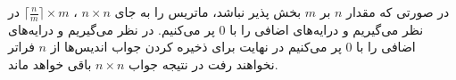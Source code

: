 \documentclass[conference]{IEEEtran-ModifiedForMVIP}
\begin{document}
در صورتی که مقدار $n$ بر $m$ بخش پذیر نباشد، 
ماتریس را به جای 
$n \times n$ ،
$ \lceil \frac{n}{m} \rceil \times m$
در نظر می‌گیریم و درایه‌های اضافی را با $0$ پر می‌کنیم.
در نظر می‌گیریم و درایه‌های اضافی را با $0$  پر می‌کنیم
در نهایت برای ذخیره کردن جواب اندیس‌ها از $n$ فراتر نخواهند رفت در نتیجه جواب $n \times n$ باقی خواهد ماند.
\end{document}
